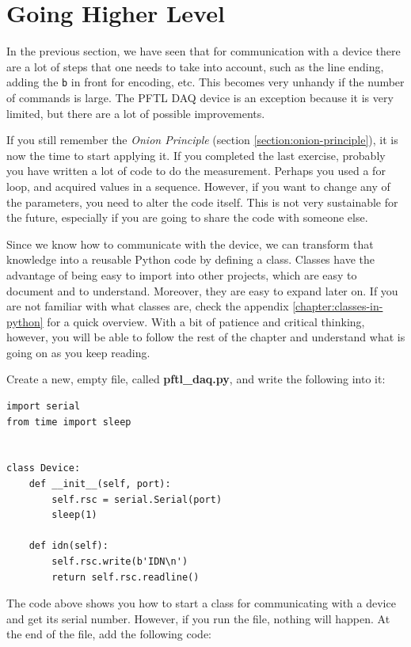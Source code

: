 \section{Going Higher Level}\label{section:going-higher-level}
In the previous section, we have seen that for communication with a device there are a lot of steps that one needs to take into account, such as the
line ending, adding the \texttt{b} in front for encoding, etc. This becomes very unhandy if the number of commands is large. The {PFTL DAQ} device is an exception because it is very limited, but there are a lot of possible improvements.

If you still remember the \emph{Onion Principle} (section \ref{section:onion-principle}), it is now the time to start applying it. If you completed the last exercise, probably you have written a lot of code to do the measurement. Perhaps you used a for loop, and acquired values in a sequence. However, if you want to change any of the parameters, you need to alter the code itself. This is not very sustainable for the future, especially if you are going to share the code with someone else.

Since we know how to communicate with the device, we can transform that knowledge into a reusable Python code by defining a class. Classes have the advantage of being easy to import into other projects, which are easy to document and to understand. Moreover, they are easy to expand later on. If you are not familiar with what classes are, check the appendix \ref{chapter:classes-in-python} for a quick overview. With a bit of patience and critical thinking, however, you will be able to follow the rest of the chapter and understand what is going on as you keep reading.

Create a new, empty file, called \textbf{pftl\_daq.py}, and write the following into it:

\begin{verbatim}
import serial
from time import sleep


class Device:
    def __init__(self, port):
        self.rsc = serial.Serial(port)
        sleep(1)

    def idn(self):
        self.rsc.write(b'IDN\n')
        return self.rsc.readline()

\end{verbatim}

The code above shows you how to start a class for communicating with a device and get its serial number. However, if you run the file, nothing will happen. At the end of the file, add the following code:

